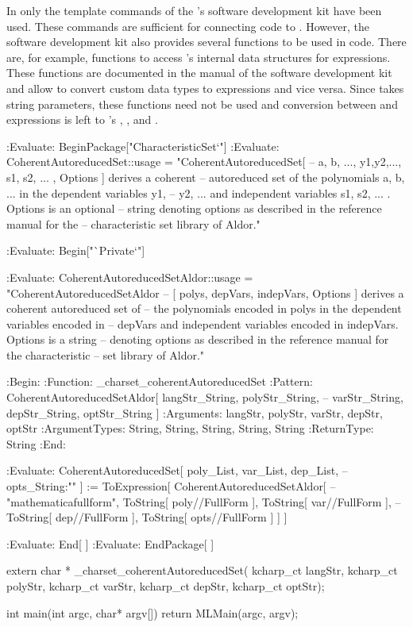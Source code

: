 In  only the \MathLink template commands of the \MathLink's \C software development kit have been used. These commands are sufficient for connecting \exportedsymbol code to \Mathematica. However, the \MathLink \C software development kit also provides several \C functions to be used in \C code. There are, for example, functions to access \Mathematica's internal data structures for expressions. These functions are documented in the manual of the \C software development kit and allow to convert custom data types to \Mathematica expressions and vice versa. Since \exportedsymbol takes string parameters, these functions need not be used and conversion between \Aldor and \Mathematica expressions is left to \Mathematica's , , and .

\clearpage
{}
\begin{mathematicaprogram}
:Evaluate:      BeginPackage["CharacteristicSet`"]
:Evaluate:      CoherentAutoreducedSet::usage = "CoherentAutoreducedSet[          --
    { a, b, ...}, {y1,y2,...}, { s1, s2, ... }, Options ] derives a coherent      --
    autoreduced set of the polynomials a, b, ... in the dependent variables y1,   --
    y2,  ... and independent variables s1, s2, ... . Options is an optional       --
    string denoting options as described in the reference manual for the          --
    characteristic set library of Aldor."

:Evaluate:      Begin["`Private`"]

:Evaluate:      CoherentAutoreducedSetAldor::usage = "CoherentAutoreducedSetAldor --
    [ polys, depVars, indepVars, Options ] derives a coherent autoreduced set of  --
    the polynomials encoded in polys in the dependent variables encoded in        --
    depVars and independent variables encoded in indepVars. Options is a string   --
    denoting options as described in the reference manual for the characteristic  --
    set library of Aldor."

:Begin:
:Function:      _charset_coherentAutoreducedSet
:Pattern:       CoherentAutoreducedSetAldor[ langStr_String, polyStr_String,      --
    varStr_String, depStr_String, optStr_String ]
:Arguments:     { langStr, polyStr, varStr, depStr, optStr }
:ArgumentTypes: { String, String, String, String, String }
:ReturnType:    String
:End:

:Evaluate:      CoherentAutoreducedSet[ poly_List, var_List, dep_List,            --
    opts_String:"" ] := ToExpression[ CoherentAutoreducedSetAldor[                --
    "mathematicafullform", ToString[ poly//FullForm ], ToString[ var//FullForm ], --
    ToString[ dep//FullForm ], ToString[ opts//FullForm ] ] ]

:Evaluate:      End[ ]
:Evaluate:      EndPackage[ ]

extern char * _charset_coherentAutoreducedSet( kcharp_ct langStr, kcharp_ct polyStr, 
  kcharp_ct varStr, kcharp_ct depStr, kcharp_ct optStr); 

int main(int argc, char* argv[])
{
  return MLMain(argc, argv);
}
\end{mathematicaprogram}

